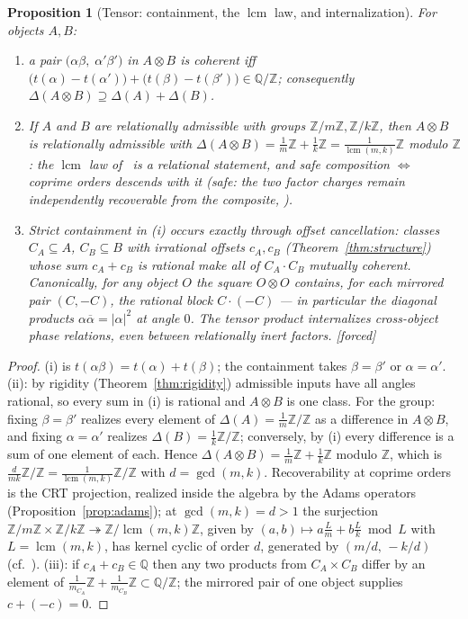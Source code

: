 \documentclass[11pt]{article}
\theoremstyle{plain}
\newtheorem{proposition}[theorem]{Proposition}
\theoremstyle{definition}
\theoremstyle{remark}
\newcommand{\Q}{\mathbb{Q}}
\newcommand{\Z}{\mathbb{Z}}
\DeclareMathOperator{\lcm}{lcm}
\newcommand{\tors}{\Q/\Z}
\newcommand{\F}{\textnormal{[forced]}}
\begin{document}
\begin{proposition}[Tensor: containment, the $\lcm$ law, and internalization]
\label{prop:tensor}
For objects $A,B$:
\begin{enumerate}
\item[(i)] a pair $\bigl(\alpha\beta,\;\alpha'\beta'\bigr)$ in $A\otimes B$ is
coherent iff
$\bigl(t(\alpha)-t(\alpha')\bigr)+\bigl(t(\beta)-t(\beta')\bigr)\in\tors$;
consequently $\Delta(A\otimes B)\supseteq\Delta(A)+\Delta(B)$.
\item[(ii)] If $A$ and $B$ are relationally admissible with groups
$\Z/m\Z,\Z/k\Z$, then $A\otimes B$ is relationally admissible with
$\Delta(A\otimes B)=\frac1m\Z+\frac1k\Z=\frac{1}{\lcm(m,k)}\Z$ modulo $\Z$: the
$\lcm$ law of~\cite[Thm.~4.2]{CMC} is a relational statement, and safe
composition $\Leftrightarrow$ coprime orders descends with it
(\emph{safe}: the two factor charges remain independently recoverable from
the composite, \cite[Thm.~4.3]{CMC}).
\item[(iii)] Strict containment in (i) occurs exactly through \emph{offset
cancellation}: classes $C_A\subseteq A$, $C_B\subseteq B$ with irrational offsets
$c_A,c_B$ (Theorem~\ref{thm:structure}) whose sum $c_A+c_B$ is rational make all
of $C_A\cdot C_B$ mutually coherent. Canonically, for any object $O$ the square
$O\otimes O$ contains, for each mirrored pair $(C,-C)$, the rational block
$C\cdot(-C)$ --- in particular the diagonal products
$\alpha\overline{\alpha}=|\alpha|^2$ at angle $0$. The tensor product
internalizes cross-object phase relations, even between relationally inert
factors. \F
\end{enumerate}
\end{proposition}

\begin{proof}
(i) is $t(\alpha\beta)=t(\alpha)+t(\beta)$; the containment takes
$\beta=\beta'$ or $\alpha=\alpha'$. (ii): by rigidity
(Theorem~\ref{thm:rigidity}) admissible inputs have all angles rational, so every
sum in (i) is rational and $A\otimes B$ is one class. For the group: fixing
$\beta=\beta'$ realizes every element of $\Delta(A)=\frac1m\Z/\Z$ as a
difference in $A\otimes B$, and fixing $\alpha=\alpha'$ realizes
$\Delta(B)=\frac1k\Z/\Z$; conversely, by (i) every difference is a sum of
one element of each. Hence $\Delta(A\otimes B)=\frac1m\Z+\frac1k\Z$ modulo
$\Z$, which is $\frac{d}{mk}\Z/\Z=\frac{1}{\lcm(m,k)}\Z/\Z$ with
$d=\gcd(m,k)$. Recoverability at coprime orders is the CRT projection,
realized inside the algebra by the Adams operators
(Proposition~\ref{prop:adams}); at $\gcd(m,k)=d>1$ the surjection
$\Z/m\Z\times\Z/k\Z\twoheadrightarrow\Z/\lcm(m,k)\Z$, given by
$(a,b)\mapsto a\tfrac{L}{m}+b\tfrac{L}{k}\bmod L$ with $L=\lcm(m,k)$, has
kernel cyclic of order $d$, generated by $(m/d,\,-k/d)$
(cf.~\cite[Thm.~4.3]{CMC}).
(iii): if $c_A+c_B\in\Q$ then any two products from $C_A\times C_B$ differ by an
element of $\frac{1}{m_{C_A}}\Z+\frac{1}{m_{C_B}}\Z\subset\tors$; the mirrored
pair of one object supplies $c+(-c)=0$.
\end{proof}
\end{document}

